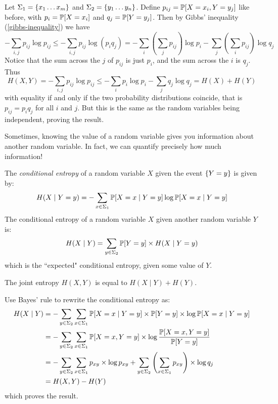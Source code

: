 \documentclass{article}
\begin{document}
\begin{prf}
    Let $\Sigma_1 = \set{x_1 \dots x_m}$
    and $\Sigma_2 = \set{y_1 \dots y_n}$.
    Define $p_{ij} = \P[X = x_i, Y = y_j]$ like before,
    with $p_i = \P[X = x_i]$ and $q_j = \P[Y = y_j]$.
    Then by Gibbs' inequality (\ref{gibbs-inequality}) we have
    \[
	-\sum_{i,j} p_{ij} \log p_{ij} \leq
	-\sum_{i,j} p_{ij} \log (p_iq_j) =
	-\sum_i \left( \sum_j p_{ij} \right) \log p_i
	-\sum_j \left( \sum_i p_{ij} \right) \log q_j 
	\]
	Notice that the sum across the $j$ of $p_{ij}$ is just $p_i$,
	and the sum across the $i$ is $q_j$. Thus
	\[
	H(X, Y) =
	-\sum_{i,j} p_{ij} \log p_{ij} \leq
	-\sum_i p_i \log p_i - \sum_j q_j \log q_j =
	H(X) + H(Y)
	\]
	with equality if and only if the two probability distributions coincide,
	that is $p_{ij} = p_i q_j$ for all $i$ and $j$.
	But this is the same as the random variables being independent,
	proving the result.
\end{prf}

Sometimes, knowing the value of a random variable
gives you information about another random variable.
In fact, we can quantify precisely how much information!

\begin{definition}
    The \textit{conditional entropy} of a random variable $X$
    given the event $\set{Y = y}$ is given by:
    \[
	H(X \mid Y = y) =
	-\sum_{x \in \Sigma_1} \P[X = x \mid Y = y] \log \P[X = x \mid Y = y]
	\]
	The conditional entropy of a random variable $X$
	given another random variable $Y$ is:
	\[
	H(X \mid Y) =
	\sum_{y \in \Sigma_2} \P[Y = y] \times H(X \mid Y = y)
	\]
	which is the ``expected" conditional entropy, given some value of $Y$.
\end{definition}

\begin{proposition}
	\label{conditional-entropy-equality}
    The joint entropy $H(X, Y)$ is equal to $H(X \mid Y) + H(Y)$.
\end{proposition}

\begin{prf}
    Use Bayes' rule to rewrite the conditional entropy as:
    \begin{align*}
    	H(X \mid Y)
    	&= -\sum_{y \in \Sigma_2}\sum_{x \in \Sigma_1}
    	\P[X = x \mid Y = y] \times \P[Y = y] \times \log \P[X = x \mid Y = y] \\
    	&= -\sum_{y \in \Sigma_2}\sum_{x \in \Sigma_1} \P[X = x, Y = y]
    	\times \log \frac{\P[X = x, Y = y] }{\P[Y=y]} \\
    	&= -\sum_{y \in \Sigma_2}\sum_{x \in \Sigma_1} p_{xy}
    	\times \log p_{xy}
    	+ \sum_{y \in \Sigma_2} \left( \sum_{x \in \Sigma_1} p_{xy} \right)
    	\times \log q_j \\
    	&= H(X, Y) - H(Y)
	\end{align*}
	which proves the result.
\end{prf}
\end{document}
